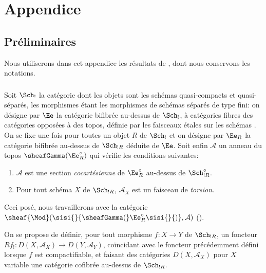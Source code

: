 \documentclass[10pt]{../fichiers-configuration-latex/smfart}
\begin{document}
\section{Appendice}\pageoriginale

\setcounter{subsection}{-1}
\subsection{Préliminaires}

Nous utiliserons dans cet appendice les résultats de ,
dont nous conservons les notations.

\subsubsection{}
Soit $\Sch_{!}$ la catégorie dont les objets sont les schémas
quasi-compacts et quasi-séparés, les morphismes étant les morphismes
de schémas séparés de type fini: on désigne par $\Ee$ la
catégorie bifibrée au-dessus de $\Sch_{!}$, à catégories fibres des
catégories opposées à des topos, définie par les faisceaux étales sur
les schémas . On se fixe une fois pour toutes un
objet $R$ de $\Sch_{!}$ et on désigne par $\Ee_{R}$ la
catégorie bifibrée au-dessus de $\Sch_{!R}$ déduite de
$\Ee$. Soit enfin $\mathcal{A}$ un anneau du topos
$\sheafGamma(\Ee^{\circ}_{R})$ qui vérifie les conditions
suivantes:
\begin{enumerate}
\renewcommand{\theenumi}{\roman{enumi}}
\renewcommand{\labelenumi}{(\theenumi)}
\item $\mathcal{A}$ est une section \emph{cocartésienne} de
$\Ee^{\circ}_{R}$ au-dessus de $\Sch^{\circ}_{!R}$.

\item Pour tout schéma $X$ de $\Sch_{!R}$, $\mathcal{A}_{X}$ est un
faisceau de \emph{torsion}.
\end{enumerate}

Ceci posé, nous travaillerons avec la catégorie
$\sheaf{\Mod}(\sisi{}{\sheafGamma(}\Ee^{\circ}_{R}\sisi{}{)},\mathcal{A})$ ().

On se propose de définir, pour tout morphisme $f:X\rightarrow Y$ de
$\Sch_{!R}$, un foncteur $Rf_{!}:D(X,\mathcal{A}_X)\rightarrow
D(Y,\mathcal{A}_{Y})$, coïncidant avec le foncteur précédemment défini
lorsque $f$ est compactifiable, et faisant des catégories
$D(X,\mathcal{A}_{X})$ pour $X$ variable une catégorie cofibrée
au-dessus de $\Sch_{!R}$.
\end{document}
